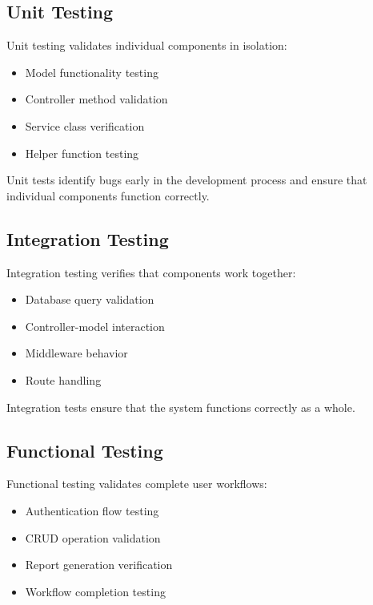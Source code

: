 \subsection{Unit Testing}

Unit testing validates individual components in isolation:

\begin{itemize}
    \item Model functionality testing
    \item Controller method validation
    \item Service class verification
    \item Helper function testing
\end{itemize}

Unit tests identify bugs early in the development process and ensure that individual components function correctly.

\subsection{Integration Testing}

Integration testing verifies that components work together:

\begin{itemize}
    \item Database query validation
    \item Controller-model interaction
    \item Middleware behavior
    \item Route handling
\end{itemize}

Integration tests ensure that the system functions correctly as a whole.

\subsection{Functional Testing}

Functional testing validates complete user workflows:

\begin{itemize}
    \item Authentication flow testing
    \item CRUD operation validation
    \item Report generation verification
    \item Workflow completion testing
\end{itemize}

